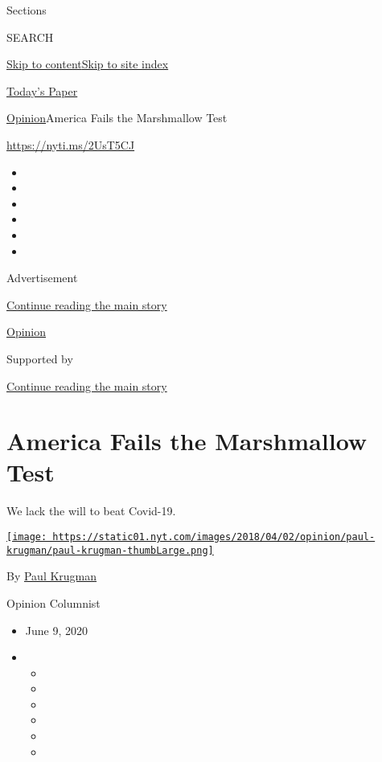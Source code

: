Sections

SEARCH

\protect\hyperlink{site-content}{Skip to
content}\protect\hyperlink{site-index}{Skip to site index}

\href{https://myaccount.nytimes.com/auth/login?response_type=cookie\&client_id=vi}{}

\href{https://www.nytimes.com/section/todayspaper}{Today's Paper}

\href{/section/opinion}{Opinion}\textbar{}America Fails the Marshmallow
Test

\url{https://nyti.ms/2UsT5CJ}

\begin{itemize}
\item
\item
\item
\item
\item
\item
\end{itemize}

Advertisement

\protect\hyperlink{after-top}{Continue reading the main story}

\href{/section/opinion}{Opinion}

Supported by

\protect\hyperlink{after-sponsor}{Continue reading the main story}

\hypertarget{america-fails-the-marshmallow-test}{%
\section{America Fails the Marshmallow
Test}\label{america-fails-the-marshmallow-test}}

We lack the will to beat Covid-19.

\href{https://www.nytimes.com/by/paul-krugman}{\texttt{[image: https://static01.nyt.com/images/2018/04/02/opinion/paul-krugman/paul-krugman-thumbLarge.png]}}

By \href{https://www.nytimes.com/by/paul-krugman}{Paul Krugman}

Opinion Columnist

\begin{itemize}
\item
  June 9, 2020
\item
  \begin{itemize}
  \item
  \item
  \item
  \item
  \item
  \item
  \end{itemize}
\end{itemize}

